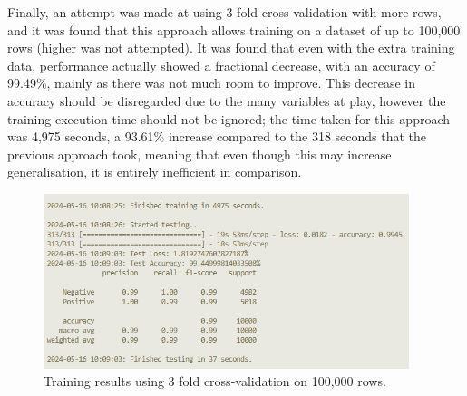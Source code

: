     Finally, an attempt was made at using 3 fold cross-validation with more rows, and it was found that this approach allows training on a dataset of up to 100,000 rows (higher was not attempted). It was found that even with the extra training data, performance actually showed a fractional decrease, with an accuracy of 99.49\%, mainly as there was not much room to improve. This decrease in accuracy should be disregarded due to the many variables at play, however the training execution time should not be ignored; the time taken for this approach was 4,975 seconds, a 93.61\% increase compared to the 318 seconds that the previous approach took, meaning that even though this may increase generalisation, it is entirely inefficient in comparison.

    \FloatBarrier
    \begin{figure}[h]
        \centering
        \includegraphics[width=0.95\textwidth]{figures/cross_validation_100000_console_overall_3f.png}
        \caption{Training results using 3 fold cross-validation on 100,000 rows.}
    \end{figure}

